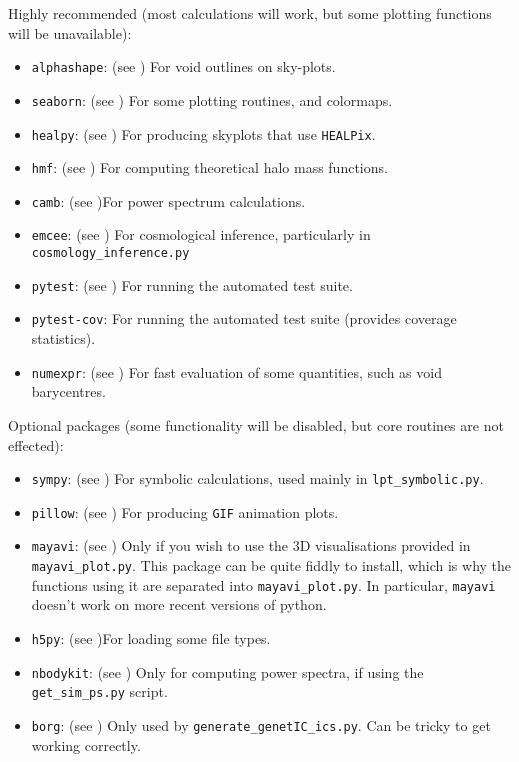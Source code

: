 \documentclass{article}
\newcommand{\codefont}[1]{{\texttt{#1}}}
\begin{document}
	Highly recommended (most calculations will work, but some plotting functions will be unavailable):
	\begin{itemize}
		\item \codefont{alphashape}: (see \citet{ken_bellock_2021_4697576}) For void outlines on sky-plots.
		\item \codefont{seaborn}: (see \citet{Waskom2021}) For some plotting routines, and colormaps.
		\item \codefont{healpy}: (see \citet{Zonca2019,2005ApJ...622..759G}) For producing skyplots that use \codefont{HEALPix}.
		\item \codefont{hmf}: (see \citet{2013A&C.....3...23M}) For computing theoretical halo mass functions.
		\item \codefont{camb}: (see \citet{2011ascl.soft02026L})For power spectrum calculations.
		\item \codefont{emcee}: (see \citet{2013PASP..125..306F}) For cosmological inference, particularly in \codefont{cosmology\_inference.py}
		\item \codefont{pytest}: (see \citet{pytest}) For running the automated test suite.
		\item \codefont{pytest-cov}: For running the automated test suite (provides coverage statistics).
		\item \codefont{numexpr}: (see \citet{cooke_2018_1492916}) For fast evaluation of some quantities, such as void barycentres.
	\end{itemize}

	Optional packages (some functionality will be disabled, but core routines are not effected):
	\begin{itemize}
		\item \codefont{sympy}: (see \citet{10.7717/peerj-cs.103}) For symbolic calculations, used mainly in \codefont{lpt\_symbolic.py}.
		\item \codefont{pillow}: (see \citet{clark2015pillow}) For producing \codefont{GIF} animation plots.
		\item \codefont{mayavi}: (see \citet{2011CSE....13b..40R}) Only if you wish to use the 3D visualisations provided in \codefont{mayavi\_plot.py}. This package can be quite fiddly to install, which is why the functions using it are separated into \codefont{mayavi\_plot.py}. In particular, \codefont{mayavi} doesn't work on more recent versions of python.
		\item \codefont{h5py}: (see \citet{andrew_collette_2022_6575970})For loading some file types.
		\item \codefont{nbodykit}: (see \citet{2018AJ....156..160H}) Only for computing power spectra, if using the \codefont{get\_sim\_ps.py} script.
		\item \codefont{borg}: (see \citet{jasche2019physical}) Only used by \codefont{generate\_genetIC\_ics.py}. Can be tricky to get working correctly.
	\end{itemize}
	
\end{document}
